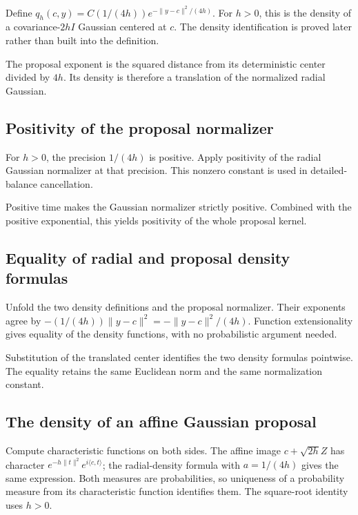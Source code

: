 \documentclass[11pt,a4paper]{article}
\begin{document}
Define \(q_h(c,y)=C(1/(4h))e^{-\|y-c\|^2/(4h)}\). For \(h>0\), this is the density of a covariance-\(2hI\) Gaussian centered at \(c\). The density identification is proved later rather than built into the definition.



The proposal exponent is the squared distance from its deterministic center divided by \(4h\). Its density is therefore a translation of the normalized radial Gaussian.


\subsection{\texorpdfstring{Positivity of the proposal normalizer}{Positivity of the proposal normalizer}}


For \(h>0\), the precision \(1/(4h)\) is positive. Apply positivity of the radial Gaussian normalizer at that precision. This nonzero constant is used in detailed-balance cancellation.



Positive time makes the Gaussian normalizer strictly positive. Combined with the positive exponential, this yields positivity of the whole proposal kernel.


\subsection{\texorpdfstring{Equality of radial and proposal density formulas}{Equality of radial and proposal density formulas}}


Unfold the two density definitions and the proposal normalizer. Their exponents agree by \(-(1/(4h))\|y-c\|^2=-\|y-c\|^2/(4h)\). Function extensionality gives equality of the density functions, with no probabilistic argument needed.



Substitution of the translated center identifies the two density formulas pointwise. The equality retains the same Euclidean norm and the same normalization constant.


\subsection{\texorpdfstring{The density of an affine Gaussian proposal}{The density of an affine Gaussian proposal}}


Compute characteristic functions on both sides. The affine image \(c+\sqrt{2h}Z\) has character \(e^{-h\|t\|^2}e^{i\langle c,t\rangle}\); the radial-density formula with \(a=1/(4h)\) gives the same expression. Both measures are probabilities, so uniqueness of a probability measure from its characteristic function identifies them. The square-root identity uses \(h>0\).
\end{document}
